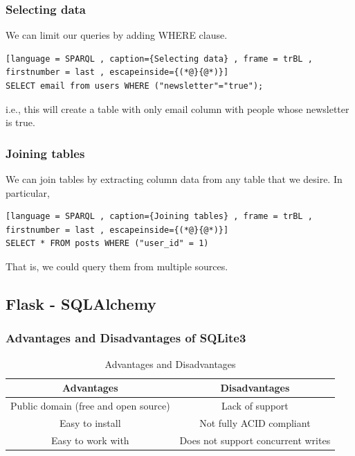 \documentclass[a4paper]{article}
\theoremstyle{plain}
\theoremstyle{definition}
\theoremstyle{remark}
\begin{document}
\begin{flushleft}
\subsubsection{Selecting data}
We can limit our queries by adding WHERE clause.
\begin{lstlisting}[language = SPARQL , caption={Selecting data} , frame = trBL , firstnumber = last , escapeinside={(*@}{@*)}]
SELECT email from users WHERE ("newsletter"="true");
\end{lstlisting}
i.e., this will create a table with only email column with people whose newsletter is true.
\subsubsection{Joining tables}
We can join tables by extracting column data from any table that we desire. In particular,
\begin{lstlisting}[language = SPARQL , caption={Joining tables} , frame = trBL , firstnumber = last , escapeinside={(*@}{@*)}]
SELECT * FROM posts WHERE ("user_id" = 1)
\end{lstlisting}
That is, we could query them from multiple sources.
\subsection{Flask - SQLAlchemy}
\subsubsection{Advantages and Disadvantages of SQLite3}
\begin{table}[H]
	\centering
	\caption{Advantages and Disadvantages}
	\label{tab:andd}
	\begin{tabular}{|c|c|}
	 \hline
	 Advantages & Disadvantages \\ \hline
	 Public domain (free and open source) & Lack of support \\
	 Easy to install & Not fully ACID compliant \\
	 Easy to work with & Does not support concurrent writes \\
	 \hline
	\end{tabular}
\end{table}

\end{flushleft}
\end{document}
